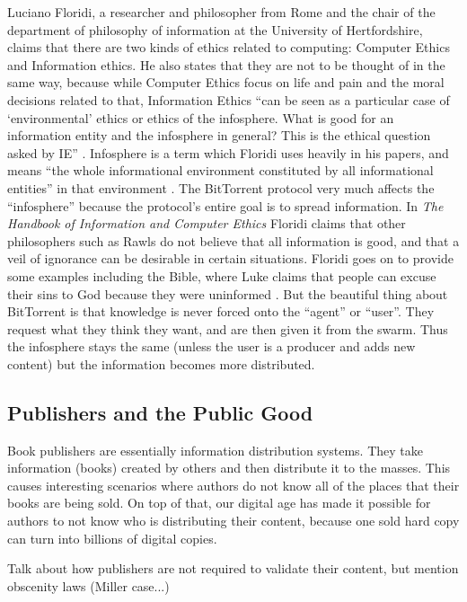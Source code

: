 \documentclass[11pt]{article}
\begin{document}
Luciano Floridi, a researcher and philosopher from Rome and the chair of the department of philosophy of information at the University of Hertfordshire, claims that there are two kinds of ethics related to computing: Computer Ethics and Information ethics. He also states that they are not to be thought of in the same way, because while Computer Ethics focus on life and pain and the moral decisions related to that, Information Ethics ``can be seen as a particular case of `environmental' ethics or ethics of the infosphere. What is good for an information entity and the infosphere in general? This is the ethical question asked by IE'' \cite{floridiInfo}. Infosphere is a term which Floridi uses heavily in his papers, and means ``the whole informational environment constituted by all informational entities'' in that environment \cite[3]{ethicshandbook}. The BitTorrent protocol very much affects the ``infosphere'' because the protocol's entire goal is to spread information. In \textit{The Handbook of Information and Computer Ethics} Floridi claims that other philosophers such as Rawls do not believe that all information is good, and that a veil of ignorance can be desirable in certain situations. Floridi goes on to provide some examples including the Bible, where Luke claims that people can excuse their sins to God because they were uninformed \cite[6]{ethicshandbook}. But the beautiful thing about BitTorrent is that knowledge is never forced onto the ``agent'' or ``user''. They request what they think they want, and are then given it from the swarm. Thus the infosphere stays the same (unless the user is a producer and adds new content) but the information becomes more distributed.

\subsection{Publishers and the Public Good}

Book publishers are essentially information distribution systems. They take information (books) created by others and then distribute it to the masses. This causes interesting scenarios where authors do not know all of the places that their books are being sold. On top of that, our digital age has made it possible for authors to not know who is distributing their content, because one sold hard copy can turn into billions of digital copies.

Talk about how publishers are not required to validate their content, but mention obscenity laws (Miller case...)
\end{document}
